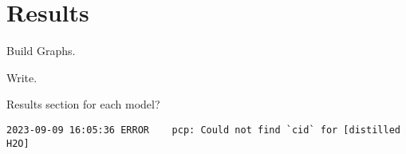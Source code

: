 \chapter{Results}\label{chap:results}

Build Graphs.

Write.

Results section for each model?



\verb!2023-09-09 16:05:36 ERROR    pcp: Could not find `cid` for [distilled H2O]!

